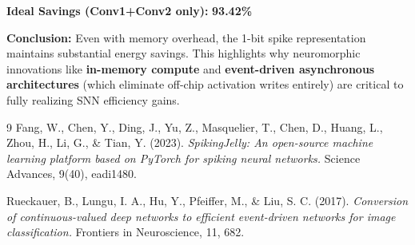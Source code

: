\documentclass[11pt, a4paper]{article}
\begin{document}
\textbf{Ideal Savings (Conv1+Conv2 only):} \textbf{93.42\%}

\textbf{Conclusion:} Even with memory overhead, the 1-bit spike representation maintains substantial energy savings. This highlights why neuromorphic innovations like \textbf{in-memory compute} and \textbf{event-driven asynchronous architectures} (which eliminate off-chip activation writes entirely) are critical to fully realizing SNN efficiency gains.

\vspace{2em}
\begin{thebibliography}{9}
Fang, W., Chen, Y., Ding, J., Yu, Z., Masquelier, T., Chen, D., Huang, L., Zhou, H., Li, G., \& Tian, Y. (2023).
\textit{SpikingJelly: An open-source machine learning platform based on PyTorch for spiking neural networks.}
Science Advances, 9(40), eadi1480.

Rueckauer, B., Lungu, I. A., Hu, Y., Pfeiffer, M., \& Liu, S. C. (2017).
\textit{Conversion of continuous-valued deep networks to efficient event-driven networks for image classification.}
Frontiers in Neuroscience, 11, 682.
\end{thebibliography}
\end{document}
